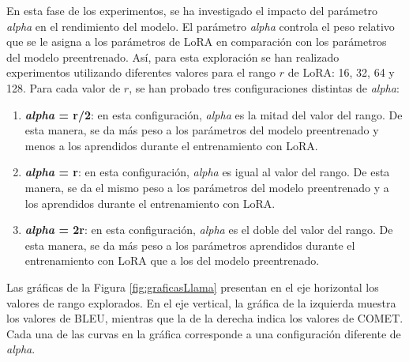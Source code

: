 \documentclass[11pt,spanish,listoffigures,listoftables]{tfgetsinf}
\begin{document}
En esta fase de los experimentos, se ha investigado el impacto del parámetro \textit{alpha} en el rendimiento del modelo. El parámetro \textit{alpha} controla el peso relativo que se le asigna a los parámetros de LoRA en comparación con los parámetros del modelo preentrenado. Así, para esta exploración se han realizado experimentos utilizando diferentes valores para el rango $r$ de LoRA: 16, 32, 64 y 128. Para cada valor de $r$, se han probado tres configuraciones distintas de \textit{alpha}:

\begin{enumerate}
	\item \textbf{\textit{alpha} = r/2}: en esta configuración, \textit{alpha} es la mitad del valor del rango. De esta manera, se da más peso a los parámetros del modelo preentrenado y menos a los aprendidos durante el entrenamiento con LoRA.
	\item \textbf{\textit{alpha} = r}: en esta configuración, \textit{alpha} es igual al valor del rango. De esta manera, se da el mismo peso a los parámetros del modelo preentrenado y a los aprendidos durante el entrenamiento con LoRA.
	\item \textbf{\textit{alpha} = 2r}: en esta configuración, \textit{alpha} es el doble del valor del rango. De esta manera, se da más peso a los parámetros aprendidos durante el entrenamiento con LoRA que a los del modelo preentrenado.
\end{enumerate}

Las gráficas de la Figura \ref{fig:graficasLlama} presentan en el eje horizontal los valores de rango explorados. En el eje vertical, la gráfica de la izquierda muestra los valores de BLEU, mientras que la de la derecha indica los valores de COMET. Cada una de las curvas en la gráfica corresponde a una configuración diferente de \textit{alpha}. 
\end{document}

